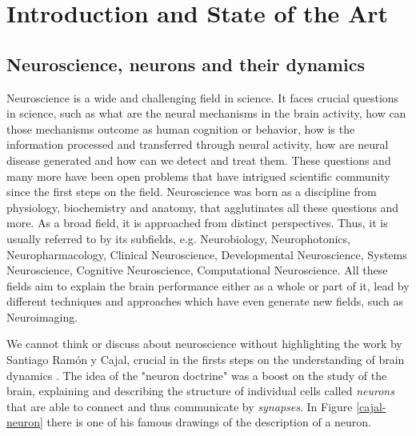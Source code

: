 \chapter{Introduction and State of the Art}
\label{c-intro}

\section{Neuroscience, neurons and their dynamics}
Neuroscience is a wide and challenging field in science. It faces crucial questions in science, such as what are the neural mechanisms in the brain activity, how can those mechanisms outcome as human cognition or behavior, how is the information processed and transferred through neural activity, how are neural disease generated and how can we detect and treat them. 
These questions and many more have been open problems that have intrigued scientific community since the first steps on the field. Neuroscience was born as a discipline from physiology, biochemistry and anatomy, that agglutinates all these questions and more. As a broad field, it is approached from distinct perspectives. Thus, it is usually referred to by its subfields, e.g. Neurobiology, Neurophotonics, Neuropharmacology, Clinical Neuroscience, Developmental Neuroscience, Systems Neuroscience, Cognitive Neuroscience, Computational Neuroscience. All these fields aim to explain the brain performance either as a whole or part of it, lead by different techniques and approaches which have even generate new fields, such as Neuroimaging.

We cannot think or discuss about neuroscience without highlighting the work by Santiago Ramón y Cajal, crucial in the firsts steps on the understanding of brain dynamics \parencite{de_carlos_historical_2007,de_castro_editorial_2016,delgado-garcia_cajal_2015,de_castro_cajal_2019}. The idea of the "neuron doctrine" was a boost on the study of the brain, explaining and describing the structure of individual cells called \textit{neurons} that are able to connect and thus communicate by \textit{synapses}. In Figure \ref{cajal-neuron} there is one of his famous drawings of the description of a neuron.

